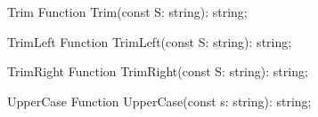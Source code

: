  
\begin{function}{Trim}
\Declaration
Function Trim(const S: string): string;
\Description
\Errors
\SeeAlso
\end{function}

 
\begin{function}{TrimLeft}
\Declaration
Function TrimLeft(const S: string): string;
\Description
\Errors
\SeeAlso
\end{function}

 
\begin{function}{TrimRight}
\Declaration
Function TrimRight(const S: string): string;
\Description
\Errors
\SeeAlso
\end{function}

 
\begin{function}{UpperCase}
\Declaration
Function UpperCase(const s: string): string;
\Description
\Errors
\SeeAlso
\end{function}

 
